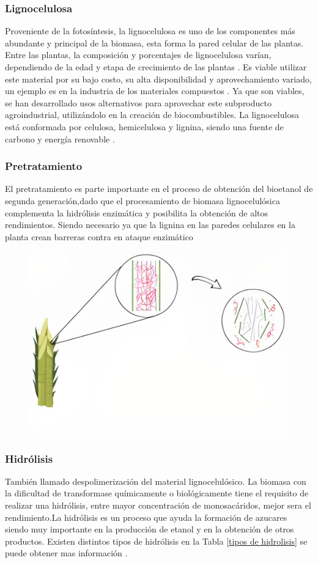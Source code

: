\documentclass[12pt]{article}
\begin{document}
		\subsubsection{Lignocelulosa}
		
		Proveniente de la fotosíntesis, la lignocelulosa es uno de los componentes más abundante y principal de la biomasa, esta forma la pared celular de las plantas. Entre las plantas, la composición y porcentajes de lignocelulosa varían, dependiendo de la edad y etapa de crecimiento de las plantas \cite{cuervo2009lignocelulosa}.
		Es viable utilizar este material por su bajo costo, su alta disponibilidad y aprovechamiento variado, un ejemplo es en la industria de los materiales compuestos \cite{jara2022principales}.
		Ya que son viables, se han desarrollado usos alternativos para aprovechar este subproducto agroindustrial, utilizándolo en la creación de biocombustibles.
		La lignocelulosa está conformada por celulosa, hemicelulosa y lignina, siendo una fuente de carbono y energía renovable \cite{portalproduccon}. 
		
		\subsubsection{Pretratamiento}
		
		El pretratamiento es parte importante en el proceso de obtención del bioetanol de segunda generación,dado que el procesamiento de biomasa lignocelulósica complementa la hidrólisis enzimática y posibilita la obtención de altos rendimientos. Siendo necesario ya que la lignina en las paredes celulares en la planta crean barreras contra en ataque enzimático %
		\newline 
		
		\begin{figure}[H]
			\centering
			\includegraphics[width=0.4\linewidth]{imagenes/pretrata_1}
			\caption[Efecto del pretratamiento de biomasa ligno- celulósica]{}
			\label{fig:pretrata1}
		\end{figure}
		
		
		\subsubsection{Hidrólisis}
		También llamado despolimerización del material lignocelulósico. La biomasa con la dificultad de transformase químicamente  o biológicamente tiene el requisito de realizar una hidrólisis, entre mayor concentración de monosacáridos, mejor sera el rendimiento.La hidrólisis es un proceso que ayuda la formación de azucares siendo muy importante en la producción de etanol y en la obtención de otros productos. Existen distintos tipos de hidrólisis en la Tabla \ref{tipos de hidrolisis} se puede obtener mas información .
		
\end{document}

